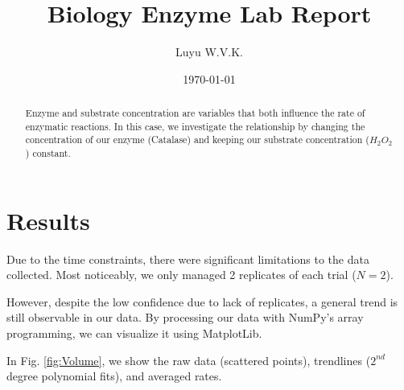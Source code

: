\documentclass[prl,twocolumn,amsmath,amssymb,superscriptaddress]{revtex4-2}
\begin{document}
 

\title{Biology Enzyme Lab Report}
\author{Luyu W.V.K.}
\date{\today}

\begin{abstract}
    Enzyme and substrate concentration are variables that both influence the rate of enzymatic reactions. In this case, we investigate the relationship by changing the concentration of our enzyme (Catalase) and keeping our substrate concentration ($H_{2}O_2$) constant.
\end{abstract}
\maketitle

\section{Results}

Due to the time constraints, there were significant limitations to the data collected. Most noticeably, we only managed 2 replicates of each trial ($N=2$).

However, despite the low confidence due to lack of replicates, a general trend is still observable in our data. By processing our data with NumPy's array programming, we can visualize it using MatplotLib.

In Fig. \ref{fig:Volume}, we show the raw data (scattered points), trendlines ($2^{nd}$ degree polynomial fits), and averaged rates.
\end{document}
